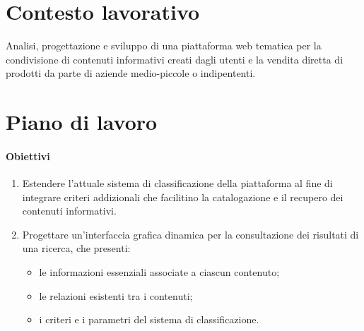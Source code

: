 \documentclass[10pt,a4paper,hidelinks]{scrartcl} %
\begin{document}
    \title{\rmfamily\normalfont{}}
    \author{}
    \date{\today}
    
    \maketitle
    
    \begin{abstract}
        \noindent Piano di lavoro settimanale per stage esterno presso \textsf{FondaMente}.
    \end{abstract}
       
    
    \section{Contesto lavorativo}
	Analisi, progettazione e sviluppo di una piattaforma web tematica per la condivisione di contenuti informativi creati dagli utenti e la vendita diretta di prodotti da parte di aziende medio-piccole o indipententi.

	\section{Piano di lavoro}

	\paragraph{Obiettivi}
	\begin{enumerate}
		\item Estendere l'attuale sistema di classificazione della piattaforma al fine di integrare criteri addizionali che facilitino la catalogazione e il recupero dei contenuti informativi.
		\item Progettare un'interfaccia grafica dinamica per la consultazione dei risultati di una ricerca, che presenti:
		\begin{itemize}
			\item le informazioni essenziali associate a ciascun contenuto;
			\item le relazioni esistenti tra i contenuti;
			\item i criteri e i parametri del sistema di classificazione.
		\end{itemize}
	\end{enumerate}
	
\end{document}

